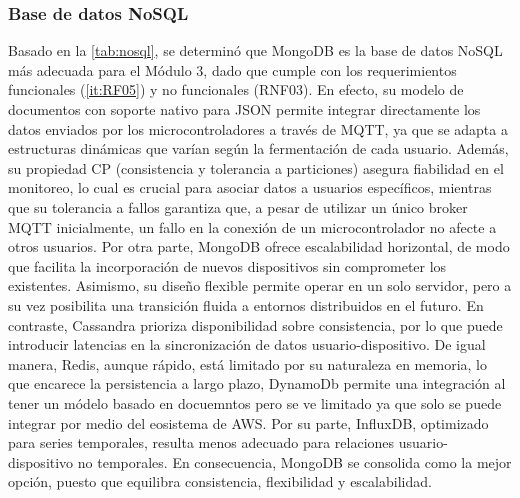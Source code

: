 \subsubsection{Base de datos NoSQL}
Basado en la \cref{tab:nosql}, se determinó que MongoDB es la base de datos NoSQL más adecuada 
para el Módulo 3, dado que cumple con los requerimientos funcionales (\ref{it:RF05}) y no funcionales 
(RNF03). En efecto, su modelo de documentos con soporte nativo para JSON permite integrar directamente
los datos enviados por los microcontroladores a través de MQTT, ya que se adapta a estructuras
dinámicas que varían según la fermentación de cada usuario. Además, su propiedad CP (consistencia y
tolerancia a particiones) asegura fiabilidad en el monitoreo, lo cual es crucial para asociar datos
a usuarios específicos, mientras que su tolerancia a fallos garantiza que, a pesar de utilizar un
único broker MQTT inicialmente, un fallo en la conexión de un microcontrolador no afecte a otros 
usuarios. Por otra parte, MongoDB ofrece escalabilidad horizontal, de modo que facilita la incorporación 
de nuevos dispositivos sin comprometer los existentes. Asimismo, su diseño flexible permite operar en un 
solo servidor, pero a su vez posibilita una transición fluida a entornos distribuidos en el futuro. 
En contraste, Cassandra prioriza disponibilidad sobre consistencia, por lo que puede introducir latencias 
en la sincronización de datos usuario-dispositivo. De igual manera, Redis, aunque rápido, está limitado 
por su naturaleza en memoria, lo que encarece la persistencia a largo plazo, DynamoDb permite una
integración al tener un módelo basado en docuemntos pero se ve limitado ya que solo se puede integrar
por medio del eosistema de AWS. Por su parte, InfluxDB, 
optimizado para series temporales, resulta menos adecuado para relaciones usuario-dispositivo no temporales. 
En consecuencia, MongoDB se consolida como la mejor opción, puesto que equilibra consistencia, flexibilidad y 
escalabilidad.
